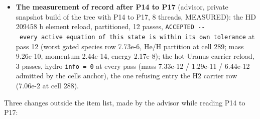 \documentclass[english,a4paper]{my_memo}
\begin{document}
\begin{itemize}
  \texttt{hybrd1} and \texttt{fdjac1} took the \texttt{unit\_step\_floor} difference-step argument,
  \texttt{Source.f90} the well-balanced arm (N37), \texttt{J\_inc.f90} the
  single-spectrum-type decision, and \texttt{speed\_estimate\_HLLC.f90} was deleted as
  dead code, so one upstream file is now removed rather than none.
  \texttt{Update\_EXHALE\_stage1.pdf} 464 -\textgreater{} 460 pages, \texttt{Update\_EXHALE.pdf} 139 -\textgreater{} 158
  pages (MEASURED, \texttt{pdfinfo}).
\item
  \textbf{The measurement of record after P14 to P17} (advisor, private snapshot
  build of the tree with P14 to P17, 8 threads, MEASURED): the HD 209458 b
  element reload, partitioned, 12 passes, \texttt{ACCEPTED\ -\/-\ every\ active\ equation\ of\ this\ state\ is\ within\ its\ own\ tolerance} at pass 12 (worst gated species
  row 7.73e-6, He/H partition at cell 289; mass 9.26e-10, momentum 2.44e-14,
  energy 2.17e-8); the hot-Uranus carrier reload, 3 passes, hydro \texttt{info\ =\ 0}
  at every pass (mass 7.33e-12 / 1.29e-11 / 6.44e-12 admitted by the cell\textquotesingle s
  anchor), the one refusing entry the H2 carrier row (7.06e-2 at cell 288).
\end{itemize}

Three changes outside the item list, made by the advisor while reading P14 to
P17:
\end{document}
